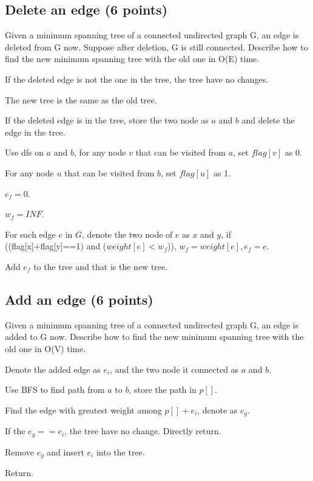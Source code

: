 \documentclass[11pt]{exam}
\begin{document}
\subsection{Delete an edge (6 points)}
Given a minimum spanning tree of a connected undirected graph G, an edge is deleted from G now. Suppose after deletion, G is still connected. Describe how to find the new minimum spanning tree with the old one in O(E) time.
\begin{solution}
    If the deleted edge is not the one in the tree, the tree have no changes.

    The new tree is the same as the old tree.

    If the deleted edge is in the tree, store the two node as $a$ and $b$ and delete the edge in the tree.

    Use dfs on $a$ and $b$, for any node $v$ that can be visited from $a$, set $flag[v]$ as 0.

    For any node $u$ that can be visited from $b$, set $flag[u]$ as 1.

    $e_f=0$.

    $w_f=INF$.

    For each edge $e$ in $G$, denote the two node of $e$ as $x$ and $y$,
    if ((flag[x]+flag[y]==1) and ($weight[e]<w_f$)), $w_f = weight[e],e_f = e$.

    Add $e_f$ to the tree and that is the new tree.
\end{solution}

\subsection{Add an edge (6 points)}
Given a minimum spanning tree of a connected undirected graph G, an edge is added to G now. Describe how to find the new minimum spanning tree with the old one in O(V) time.
\begin{solution}
    Denote the added edge as $e_i$, and the two node it connected as $a$ and $b$.

    Use BFS to find path from $a$ to $b$, store the path in $p[]$.

    Find the edge with greatest weight among $p[] + e_i$, denote as $e_g$.

    If the $e_g==e_i$, the tree have no change. Directly return.

    Remove $e_g$ and insert $e_i$ into the tree.

    Return.

\end{solution}
\end{document}
